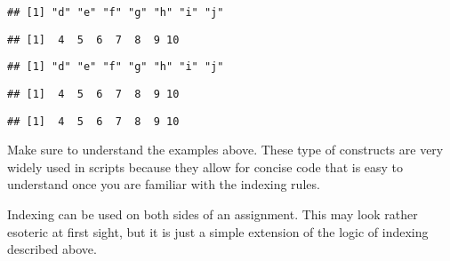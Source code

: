 \documentclass[paper=a4,headsepline,BCOR=12mm,twoside,open=right,%
titlepage,headings=small,fontsize=10pt,index=totoc,bibliography=totoc,%
captions=tableheading,captions=nooneline]{scrbook}\usepackage{knitr}
\begin{document}
\begin{knitrout}
\begin{kframe}
\begin{alltt}
\end{alltt}
\begin{verbatim}
## [1] "d" "e" "f" "g" "h" "i" "j"
\end{verbatim}
\begin{alltt}
 \hlopt{>} \hlstd{)}
\end{alltt}
\begin{verbatim}
## [1]  4  5  6  7  8  9 10
\end{verbatim}
\begin{alltt}
 \hlkwb{<-}  \hlopt{>} \hlstd{)}
\end{alltt}
\begin{verbatim}
## [1] "d" "e" "f" "g" "h" "i" "j"
\end{verbatim}
\begin{alltt}
 \hlkwb{<-} \hlopt{:}
\end{alltt}
\begin{verbatim}
## [1]  4  5  6  7  8  9 10
\end{verbatim}
\begin{alltt}
\end{alltt}
\begin{verbatim}
## [1]  4  5  6  7  8  9 10
\end{verbatim}
\end{kframe}
\end{knitrout}

Make sure to understand the examples above. These type of constructs are very widely used in \R scripts because they allow for concise code that is easy to understand once you are familiar with the indexing rules.

Indexing can be used on both sides of an assignment. This may look rather esoteric at first sight, but it is just a simple extension of the logic of indexing described above.
\end{document}
